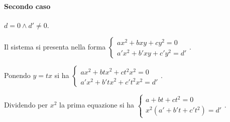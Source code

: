 \paragraph{Secondo caso}\(d=0 \wedge d'\neq 0\).

Il sistema si presenta nella forma \(\left\{\begin{array}{l}{{ax}^2+{bxy}+{cy}^2=0}\\{a'x^2+b'{xy}+c'y^2=d'}\end{array}\right.\).

Ponendo \(y={tx}\) si ha \(\left\{\begin{array}{l}{{ax}^2+{btx}^2+{ct}^2x^2=0}\\{a'x^2+b'{tx}^2+c't^2x^2=d'}\end{array}\right.\).

Dividendo per \(x^2\) la prima equazione si ha \(\left\{\begin{array}{l}{a+{bt}+{ct}^2=0}\\{x^2(a'+b't+c't^2)=d'}\end{array}\right.\).


